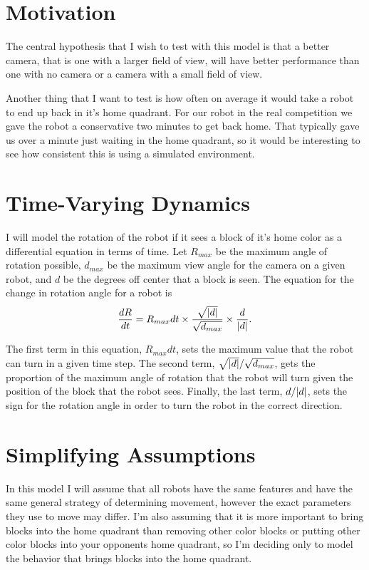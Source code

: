 \documentclass[12pt]{article}
\begin{document}
\section{Motivation}
The central hypothesis that I wish to test with this model is that a better camera, that is one with a larger field of view, will have better performance than one with no camera or a camera with a small field of view. 

Another thing that I want to test is how often on average it would take a robot to end up back in it's home quadrant. For our robot in the real competition we gave the robot a conservative two minutes to get back home. That typically gave us over a minute just waiting in the home quadrant, so it would be interesting to see how consistent this is using a simulated environment.

\section{Time-Varying Dynamics}
I will model the rotation of the robot if it sees a block of it's home color as a differential equation in terms of time. Let $R_{max}$ be the maximum angle of rotation possible, $d_{max}$ be the maximum view angle for the camera on a given robot, and $d$ be the degrees off center that a block is seen. The equation for the change in rotation angle for a robot is
\begin{equation}
  \frac{dR}{dt} = R_{max}dt \times \frac{\sqrt{\abs{d}}}{\sqrt{d_{max}}} \times \frac{d}{\abs{d}}.
\end{equation}

The first term in this equation, $R_{max}dt$, sets the maximum value that the robot can turn in a given time step. The second term, $\sqrt{\abs{d}}/\sqrt{d_{max}}$, gets the proportion of the maximum angle of rotation that the robot will turn given the position of the block that the robot sees. Finally, the last term, $d/\abs{d}$, sets the sign for the rotation angle in order to turn the robot in the correct direction.

\section{Simplifying Assumptions}
In this model I will assume that all robots have the same features and have the same general strategy of determining movement, however the exact parameters they use to move may differ. I'm also assuming that it is more important to bring blocks into the home quadrant than removing other color blocks or putting other color blocks into your opponents home quadrant, so I'm deciding only to model the behavior that brings blocks into the home quadrant.
\end{document}
